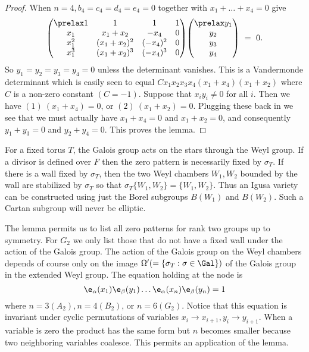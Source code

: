 \documentclass{memo-l}
\theoremstyle{definition}
\theoremstyle{remark}
\numberwithin{section}{chapter}
\numberwithin{equation}{chapter}
\begin{document}
\begin{proof}
When $n = 4, b_{4} = c_{4} = d_{4} = e_{4} = 0$ together with $x_{1}+\ldots +x_{4} = 0$ 
give
$$
{\begin{pmatrix} \prelax  
1 & 1 & 1 & 1\\ x_{1} & x_1 + x_2 & -x_4 & 0 \\ 
x_{1}^2 & (x_1+x_2)^2 & (-x_4)^2 & 0 \\ x_1^3 & (x_1+x_2)^3 & (-x_4)^3 & 0
\end{pmatrix}} {\begin{pmatrix} \prelax  y_1 \\ y_2 \\ y_3 \\ y_4 \end{pmatrix}}\ =\ 0 .
$$
So $y_{1} = y_{2} = y_{3} = y_{4} = 0$ unless the determinant vanishes. 
 This is a Vandermonde determinant which is easily seen to equal 
$Cx_{1}x_{2}x_{3}x_{4}(x_{1}+x_{4})(x_{1}+x_{2})$ where $C$ is a non-zero 
constant $(C = -1)$. 
 Suppose that $x_{i}y_{i}\ne 0$ for all $i$. 
 Then we have $(1)\ (x_{1}+x_{4})=0$, or $(2)\ (x_{1}+x_{2}) = 0$. 
 Plugging these back in we see that we must actually have $x_{1}+x_{4} = 0$ and 
$x_{1}+x_{2} = 0$, and consequently $y_{1}+y_{3} = 0$ and $y_{2}+y_{4} = 0$. 
 This proves the lemma.   
 \end{proof} 

   For a fixed torus $T$, the Galois group acts on the stars through the
Weyl group. 
 If a divisor is defined over $F$ then the zero pattern is necessarily fixed 
by ${\sigma}_{T}$. 
 If there is a wall fixed by ${\sigma}_{T}$, then the two Weyl chambers 
$W_{1}, W_{2}$ bounded by the wall are stabilized by ${\sigma}_{T}$ so that 
${\sigma}_{T}\{W_{1}, W_{2}\} = \{W_{1},W_{2}\}$. 
 Thus an Igusa variety can be constructed using just the Borel subgroups  $B(W_{1})$ 
and $B(W_{2})$.  Such a Cartan subgroup will never be elliptic.

   The lemma permits us to list all zero patterns for rank two groups up 
to symmetry. 
 For $G_{2}$ we only list those that do not have a fixed wall under the 
action of the Galois group. 
 The action of the Galois group on the Weyl chambers depends of course 
only on the image ${\Omega}'(= \{{\sigma}_{T}:{\sigma} \in \Gal\})$ 
of the Galois group in the extended Weyl group. 
The equation holding at the node is
$$
{\e}_{\alpha}(x_{1}){\e}_{\beta}(y_{1})\ldots 
{\e}_{\alpha}(x_n)\e_\beta(y_n) = 1
$$ 
where $n = 3 (A_{2}), n = 4 (B_{2})$, or $n = 6 (G_{2})$. 
 Notice that this equation is invariant under cyclic permutations of variables 
$x_{i} {\to} x_{i+1}, y_{i} {\to} y_{i+1}$. 
 When a variable is zero the product has the same form but $n$ becomes 
smaller because two neighboring variables coalesce. 
 This permits an application of the lemma. 
\end{document}
